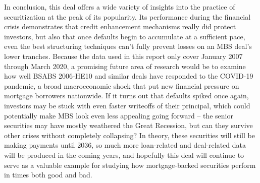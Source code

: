 \documentclass[12pt]{article}
\begin{document}
In conclusion, this deal offers a wide variety of insights into the practice of securitization at the peak of its popularity. Its performance during the financial crisis demonstrates that credit enhancement mechanisms really did protect investors, but also that once defaults begin to accumulate at a sufficient pace, even the best structuring techniques can’t fully prevent losses on an MBS deal’s lower tranches. Because the data used in this report only cover January 2007 through March 2020, a promising future area of research would be to examine how well BSABS 2006-HE10 and similar deals have responded to the COVID-19 pandemic, a broad macroeconomic shock that put new financial pressure on mortgage borrowers nationwide. If it turns out that defaults spiked once again, investors may be stuck with even faster writeoffs of their principal, which could potentially make MBS look even less appealing going forward – the senior securities may have mostly weathered the Great Recession, but can they survive other crises without completely collapsing? In theory, these securities will still be making payments until 2036, so much more loan-related and deal-related data will be produced in the coming years, and hopefully this deal will continue to serve as a valuable example for studying how mortgage-backed securities perform in times both good and bad.

\newpage

\nocite{*}
\printbibliography
\end{document}

